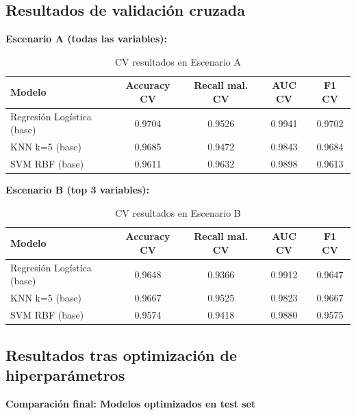\documentclass[11pt,a4paper]{article}
\begin{document}
\subsection{Resultados de validación cruzada}

\textbf{Escenario A (todas las variables):}

\begin{table}[H]
\centering
\caption{CV resultados en Escenario A}
\small
\renewcommand{\arraystretch}{1.2}
\begin{tabular}{lcccc}
\toprule
\textbf{Modelo} & \textbf{Accuracy CV} & \textbf{Recall mal. CV} & \textbf{AUC CV} & \textbf{F1 CV} \\
\midrule
Regresión Logística (base) & 0.9704 & 0.9526 & 0.9941 & 0.9702 \\
KNN k=5 (base) & 0.9685 & 0.9472 & 0.9843 & 0.9684 \\
\rowcolor{bestrow}
SVM RBF (base) & 0.9611 & 0.9632 & 0.9898 & 0.9613 \\
\bottomrule
\end{tabular}
\normalsize
\end{table}

\textbf{Escenario B (top 3 variables):}

\begin{table}[H]
\centering
\caption{CV resultados en Escenario B}
\small
\renewcommand{\arraystretch}{1.2}
\begin{tabular}{lcccc}
\toprule
\textbf{Modelo} & \textbf{Accuracy CV} & \textbf{Recall mal. CV} & \textbf{AUC CV} & \textbf{F1 CV} \\
\midrule
Regresión Logística (base) & 0.9648 & 0.9366 & 0.9912 & 0.9647 \\
\rowcolor{bestrow}
KNN k=5 (base) & 0.9667 & 0.9525 & 0.9823 & 0.9667 \\
SVM RBF (base) & 0.9574 & 0.9418 & 0.9880 & 0.9575 \\
\bottomrule
\end{tabular}
\normalsize
\end{table}

\subsection{Resultados tras optimización de hiperparámetros}

\textbf{Comparación final: Modelos optimizados en test set}
\end{document}
